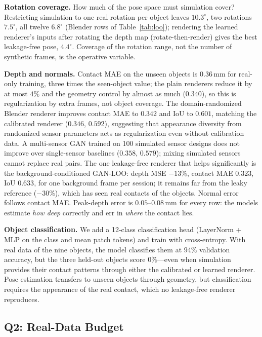 \noindent\textbf{Rotation coverage.} How much of the pose space must simulation cover? Restricting simulation to one real rotation per object leaves $10.3^\circ$, two rotations $7.5^\circ$, all twelve $6.8^\circ$ (Blender rows of Table~\ref{tab:loo}); rendering the learned renderer's inputs after rotating the depth map (rotate-then-render) gives the best leakage-free pose, $4.4^\circ$. Coverage of the rotation range, not the number of synthetic frames, is the operative variable.

\noindent\textbf{Depth and normals.} Contact MAE on the unseen objects is $0.36\,$mm for real-only training, three times the seen-object value; the plain renderers reduce it by at most $4\%$ and the geometry control by almost as much ($0.340$), so this is regularization by extra frames, not object coverage. The domain-randomized Blender renderer improves contact MAE to $0.342$ and IoU to $0.601$, matching the calibrated renderer ($0.346$, $0.592$), suggesting that appearance diversity from randomized sensor parameters acts as regularization even without calibration data. A multi-sensor GAN trained on 100 simulated sensor designs does not improve over single-sensor baselines ($0.358$, $0.579$); mixing simulated sensors cannot replace real pairs. The one leakage-free renderer that helps significantly is the background-conditioned GAN-LOO: depth MSE $-13\%$, contact MAE $0.323$, IoU $0.633$, for one background frame per session; it remains far from the leaky reference ($-30\%$), which has seen real contacts of the objects. Normal error follows contact MAE. Peak-depth error is $0.05$--$0.08\,$mm for every row: the models estimate \emph{how deep} correctly and err in \emph{where} the contact lies.

\noindent\textbf{Object classification.} We add a 12-class classification head (LayerNorm + MLP on the class and mean patch tokens) and train with cross-entropy. With real data of the nine objects, the model classifies them at $94\%$ validation accuracy, but the three held-out objects score $0\%$---even when simulation provides their contact patterns through either the calibrated or learned renderer. Pose estimation transfers to unseen objects through geometry, but classification requires the appearance of the real contact, which no leakage-free renderer reproduces.

\subsection{Q2: Real-Data Budget}
\label{sec:kshot}

